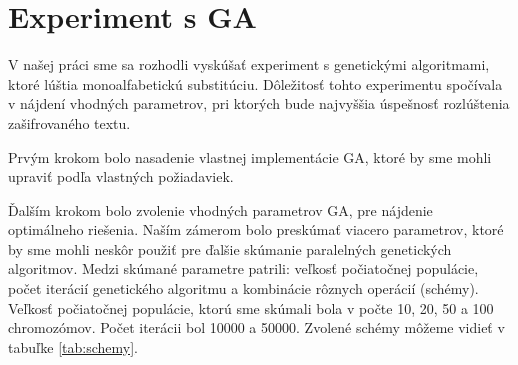 \section{Experiment s GA}
V našej práci sme sa rozhodli vyskúšať experiment s genetickými algoritmami, ktoré lúštia monoalfabetickú substitúciu.
Dôležitosť tohto experimentu spočívala v nájdení vhodných parametrov, pri ktorých bude najvyššia úspešnosť rozlúštenia zašifrovaného textu.

Prvým krokom bolo nasadenie vlastnej implementácie GA, ktoré by sme mohli upraviť podľa vlastných požiadaviek.

Ďalším krokom bolo zvolenie vhodných parametrov GA, pre nájdenie optimálneho riešenia.
Naším zámerom bolo preskúmať viacero parametrov, ktoré by sme mohli neskôr použiť pre ďalšie skúmanie paralelných genetických algoritmov. 
Medzi skúmané parametre patrili: veľkosť počiatočnej populácie, počet iterácií genetického algoritmu a kombinácie rôznych operácií (schémy).
Veľkosť počiatočnej populácie, ktorú sme skúmali bola v počte 10, 20, 50 a 100 chromozómov. Počet iterácii bol 10000 a 50000. 
Zvolené schémy môžeme vidieť v tabuľke \ref{tab:schemy}.


